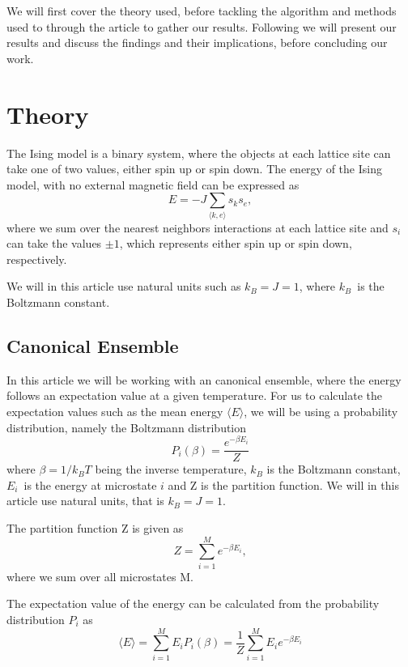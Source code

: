 \documentclass[%
reprint,
nofootinbib,
amsmath,amssymb,
aps,
]{revtex4-1}
\begin{document}
We will first cover the theory used, before tackling the algorithm and methods used to through the article to gather our results. Following we will present our results and discuss the findings and their implications, before concluding our work. 
\section{Theory} %
The Ising model is a binary system, where the objects at each lattice site can take one of two values, either spin up or spin down. 
The energy of the Ising model, with no external magnetic field can be expressed as 
\begin{equation}
	E = -J\sum_{\langle k,e \rangle} s_ks_e,
\end{equation}
where we sum over the nearest neighbors interactions at each lattice site and $s_i$ can take the values $\pm 1$, which represents either spin up or spin down, respectively. 

We will in this article use natural units such as $k_B = J = 1$, where $k_B$ is the Boltzmann constant. 
\subsection{Canonical Ensemble} %
In this article we will be working with an canonical ensemble, where the energy follows an expectation value at a given temperature. For us to calculate the expectation values such as the mean energy $\langle E \rangle$, we will be using a probability distribution, namely the Boltzmann distribution
\begin{equation}\label{eq:boltz}
	P_i(\beta) = \frac{e^{-\beta E_i}}{Z}
\end{equation}
where $\beta = 1/k_BT$ being the inverse temperature, $k_B$ is the Boltzmann constant, $E_i$ is the energy at microstate $i$ and Z is the partition function. We will in this article use natural units, that is $k_B = J = 1$. 

The partition function Z is given as 
\begin{equation}\label{eq:Z}
	Z = \sum_{i=1}^{M}e^{-\beta E_i},
\end{equation} 
where we sum over all microstates M.

The expectation value of the energy can be calculated from the probability distribution $P_i$ as 
\begin{equation}\label{eq:E}
	\langle E\rangle = \sum_{i=1}^{M}E_iP_i(\beta) = \frac{1}{Z}\sum_{i=1}^ME_ie^{-\beta E_i}
\end{equation}
\end{document}
